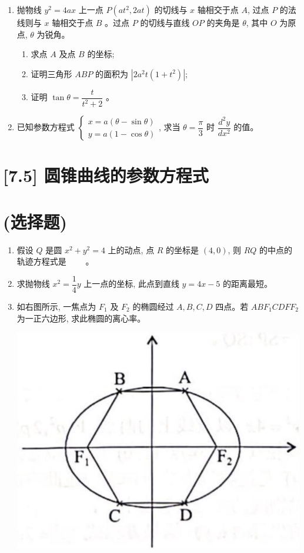 \documentclass[10pt]{article}
\begin{document}
\begin{enumerate}
  \item 抛物线 $y^{2}=4 a x$ 上一点 $P\left(a t^{2}, 2 a t\right)$ 的切线与 $x$ 轴相交于点 $A$, 过点 $P$ 的法线则与 $x$ 轴相交于点 $B$ 。过点 $P$ 的切线与直线 $OP$ 的夹角是 $\theta$, 其中 $O$ 为原点, $\theta$ 为锐角。
  \begin{enumerate}
    \item 求点 $A$ 及点 $B$ 的坐标;
    \item 证明三角形 $ABP$ 的面积为 $\left|2 a^{2} t\left(1+t^{2}\right)\right|$;
    \item 证明 $\tan \theta=\dfrac{t}{t^{2}+2}$ 。
  \end{enumerate}
  \item 已知参数方程式 $\left\{\begin{array}{l}x=a(\theta-\sin \theta) \\ y=a(1-\cos \theta)\end{array}\right.$, 求当 $\theta=\dfrac{\pi}{3}$ 时 $\dfrac{d^{2} y}{d x^{2}}$ 的值。
\end{enumerate}

\section*{[7.5] 圆锥曲线的参数方程式}
\section*{(选择题)}
\begin{enumerate}
  \item 假设 $Q$ 是圆 $x^{2}+y^{2}=4$ 上的动点, 点 $R$ 的坐标是 $(4,0)$, 则 $RQ$ 的中点的轨迹方程式是 $\qquad$。
  \item 求抛物线 $x^{2}=\dfrac{1}{4} y$ 上一点的坐标, 此点到直线 $y=4 x-5$ 的距离最短。
  \item 如右图所示, 一焦点为 $F_{1}$ 及 $F_{2}$ 的椭圆经过 $A, B, C, D$ 四点。若 $A B F_{1} C D F F_{2}$ 为一正六边形, 求此椭圆的离心率。
  \begin{center}
    \includegraphics[max width=\textwidth]{2024_06_05_971e6815482d5ecd2718g-14}
  \end{center}
\end{enumerate}
\end{document}
